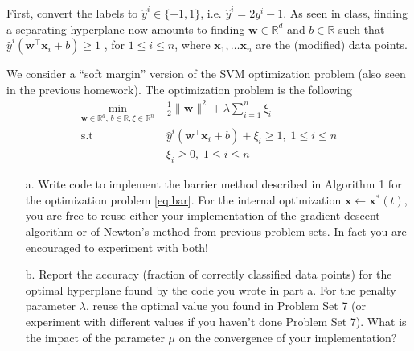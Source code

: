 \documentclass[11pt]{article}
\theoremstyle{remark}
\newcommand{\R}{\mathbb{R}}                     %
\newcommand{\bx}{\mathbf{x}}
\newcommand{\bw}{\mathbf{w}}
\begin{document}
First, convert the labels to $\hat{y}^i\in\{-1, 1\}$, i.e. $\hat{y}^i
= 2y^i - 1$.
%
As seen in class, finding a separating hyperplane now amounts to
finding $\bw\in\R^d$ and $b \in \R$ such that
$\hat{y}^i (\bw^\intercal\bx_i +b)\geq 1$ , for $1\leq i\leq n$, where $\bx_1,\dots\bx_n$ are
the (modified) data points.

We consider a ``soft margin'' version of the SVM optimization problem
(also seen in the previous homework).
The optimization problem is the following
\begin{equation}
    \label{eq:bar}
    \begin{aligned}
        \min_{\bw\in\R^d,\, b \in  \R, \xi\in\R^n}&\; \frac{1}{2}\|\bw\|^2
        + \lambda\sum_{i=1}^n\xi_i\\
        \text{s.t} &\; \hat{y}^i(\bw^\intercal\bx_i +b) + \xi_i \geq 1 ,\;1\leq i\leq n\\
                   &\; \xi_i\geq 0,\;1\leq i\leq n
    \end{aligned}
\end{equation}


\begin{itemize}
    \item[a.] Write code to implement the barrier method described in Algorithm
        1 for the optimization problem \eqref{eq:bar}. For the internal
          optimization $\bx\gets \bx^*(t)$, you are free to reuse either your
          implementation of the gradient descent algorithm or of Newton's
          method from previous problem sets. In fact you are encouraged to
          experiment with both!
    \item[b.] Report the accuracy (fraction of correctly classified data
        points) for the optimal hyperplane found by the code you wrote in part
        a. For the penalty parameter $\lambda$, reuse the optimal value
        you found in Problem Set 7 (or experiment with different values if you
        haven't done Problem Set 7). What is the impact of the parameter $\mu$
        on the convergence of your implementation?
\end{itemize}
\end{document}

